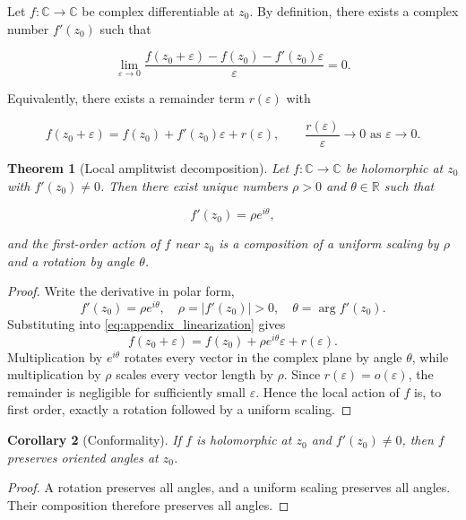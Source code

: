 \documentclass[11pt, a4paper]{article}
\theoremstyle{plain}
\newtheorem{theorem}{Theorem}[section]
\newtheorem{corollary}[theorem]{Corollary}
\theoremstyle{definition}
\theoremstyle{remark}
\begin{document}
Let $f:\mathbb{C}\to\mathbb{C}$ be complex differentiable at $z_0$. By definition,
there exists a complex number $f'(z_0)$ such that

\begin{equation}
\lim_{\varepsilon\to 0}
\frac{f(z_0+\varepsilon)-f(z_0)-f'(z_0)\varepsilon}{\varepsilon}=0.
\end{equation}

Equivalently, there exists a remainder term $r(\varepsilon)$ with

\begin{equation}
f(z_0+\varepsilon)=f(z_0)+f'(z_0)\varepsilon+r(\varepsilon),
\qquad
\frac{r(\varepsilon)}{\varepsilon}\to 0
\text{ as }
\varepsilon\to 0.
\label{eq:appendix_linearization}
\end{equation}

\begin{theorem}[Local amplitwist decomposition]
Let $f:\mathbb{C}\to\mathbb{C}$ be holomorphic at $z_0$ with $f'(z_0)\neq 0$.
Then there exist unique numbers $\rho>0$ and $\theta\in\mathbb{R}$ such that

\begin{equation}
f'(z_0)=\rho e^{i\theta},
\end{equation}

and the first-order action of $f$ near $z_0$ is a composition of a uniform scaling
by $\rho$ and a rotation by angle $\theta$.
\end{theorem}

\begin{proof}
Write the derivative in polar form,
\[
f'(z_0)=\rho e^{i\theta}, \quad \rho=|f'(z_0)|>0, \quad \theta=\arg f'(z_0).
\]
Substituting into \eqref{eq:appendix_linearization} gives
\[
f(z_0+\varepsilon)=f(z_0)+\rho e^{i\theta}\varepsilon+r(\varepsilon).
\]
Multiplication by $e^{i\theta}$ rotates every vector in the complex plane by angle
$\theta$, while multiplication by $\rho$ scales every vector length by $\rho$.
Since $r(\varepsilon)=o(\varepsilon)$, the remainder is negligible for sufficiently
small $\varepsilon$. Hence the local action of $f$ is, to first order, exactly a
rotation followed by a uniform scaling.
\end{proof}

\begin{corollary}[Conformality]
If $f$ is holomorphic at $z_0$ and $f'(z_0)\neq 0$, then $f$ preserves oriented
angles at $z_0$.
\end{corollary}

\begin{proof}
A rotation preserves all angles, and a uniform scaling preserves all angles.
Their composition therefore preserves all angles.
\end{proof}
\end{document}
